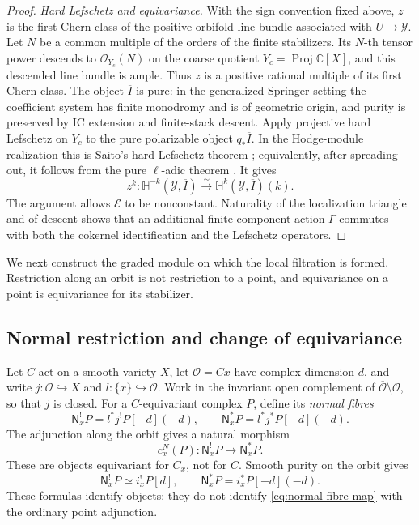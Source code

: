 \documentclass[10pt,a4paper]{amsart}
\begin{document}
\begin{proof}
\smallskip
\noindent\emph{Hard Lefschetz and equivariance.}
With the sign convention fixed above, $z$ is the first Chern class of the positive
orbifold line bundle associated with $U\to\mathcal Y$.  Let $N$ be a common
multiple of the orders of the finite stabilizers.  Its $N$-th tensor power
descends to $\mathcal O_{Y_c}(N)$ on the coarse quotient
$Y_c=\operatorname{Proj}\mathbb C[X]$, and this descended line bundle is
ample.  Thus $z$ is a positive rational multiple of its first Chern class.
The object $\overline I$ is pure:
in the generalized Springer setting the coefficient system has finite
monodromy and is of geometric origin, and purity is preserved by IC
extension and finite-stack descent.  Apply projective hard Lefschetz on
$Y_c$ to the pure polarizable object $q_*\overline I$.  In the Hodge-module
realization this is Saito's hard Lefschetz theorem
\cite[Th\'eor\`eme~5.3.1]{SaitoPolarizable}; equivalently, after spreading
out, it follows from the pure $\ell$-adic theorem
\cite[Th\'eor\`eme~5.4.10]{BBD}.  It gives
\[
 z^k:\mathbb H^{-k}(\mathcal Y,\overline I)
 \xrightarrow{\sim}
 \mathbb H^k(\mathcal Y,\overline I)(k).
\]
The argument allows $\mathcal E$ to be nonconstant.  Naturality of the
localization triangle and of descent shows that an additional finite
component action $\Gamma$ commutes with
both the cokernel identification and the Lefschetz operators.
\end{proof}

We next construct the graded module on which the local filtration is
formed.  Restriction along an orbit is not restriction to a point, and
equivariance on a point is equivariance for its stabilizer.

\subsection{Normal restriction and change of equivariance}

Let $C$ act on a smooth variety $X$, let $\mathcal O=Cx$ have complex
dimension $d$, and write $j:\mathcal O\hookrightarrow X$ and
$l:\{x\}\hookrightarrow\mathcal O$.  Work in the invariant open complement
of $\overline{\mathcal O}\setminus\mathcal O$, so that $j$ is closed.
For a $C$-equivariant complex $P$, define its \emph{normal fibres}
\[
 \mathsf N_x^!P=l^*j^!P[-d](-d),\qquad
 \mathsf N_x^*P=l^*j^*P[-d](-d).
\]
The adjunction along the orbit gives a natural morphism
\begin{equation}\label{eq:normal-fibre-map}
 c_x^N(P):\mathsf N_x^!P\longrightarrow\mathsf N_x^*P.
\end{equation}
These are objects equivariant for $C_x$, not for $C$.  Smooth purity
on the orbit gives
\begin{equation}\label{eq:normal-point-objects}
 \mathsf N_x^!P\simeq i_x^!P[d],\qquad
 \mathsf N_x^*P=i_x^*P[-d](-d).
\end{equation}
These formulas identify objects; they do not identify
\eqref{eq:normal-fibre-map} with the ordinary point adjunction.
\end{document}
